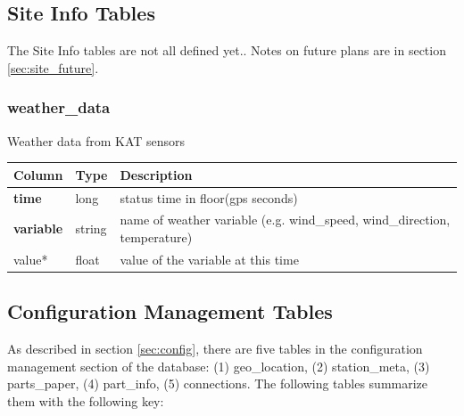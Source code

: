 \documentclass{article}
\begin{document}
{%

\subsection{Site Info Tables}
The Site Info tables are not all defined yet.. Notes on future plans are in section \ref{sec:site_future}.

\subsubsection{weather\_data}
Weather data from KAT sensors
\begin{center}
 \begin{tabular}{| p{4cm} | p{2cm} | p{10cm} |}
\hline
 {\bf Column} & {\bf Type}  & {\bf Description} \\ [0.5ex]  \hline\hline
\textbf{time} & long & status time in floor(gps seconds)\\ \hline
\textbf{variable} & string & name of weather variable (e.g. wind\_speed,  wind\_direction, temperature) \\ \hline
value* & float & value of the variable at this time \\\hline
\end{tabular}
\end{center}



\subsection{Configuration Management Tables}
As described in section  \ref{sec:config}, there are five tables in the configuration management section of the database:  (1) geo\_location, (2) station\_meta,
(3) parts\_paper, (4) part\_info, (5) connections.  The following tables summarize them with the following key:

}
\end{document}
